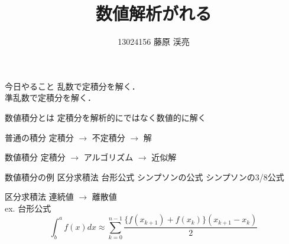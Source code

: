 \documentclass[dvipdfmx,xcolor={svgnames},17pt]{beamer}
\title{数値解析が\jruby{乱数}{み|だ}れる}
\author{13024156 藤原 渓亮}
\begin{document}
  \maketitle

  \begin{frame}{今日やること}
    乱数で定積分を解く．\\
    準乱数で定積分を解く．
  \end{frame}

  \begin{frame}{数値積分とは}
    定積分を解析的にではなく数値的に解く
    \begin{block}{普通の積分}
      定積分 $\rightarrow$ 不定積分 $\rightarrow$ 解
    \end{block}
    \begin{block}{数値積分}
      定積分 $\rightarrow$ アルゴリズム $\rightarrow$ 近似解
    \end{block}
  \end{frame}

  \begin{frame}{数値積分の例}
    区分求積法
      台形公式
      シンプソンの公式
      シンプソンの3/8公式
  \end{frame}

  \begin{frame}{区分求積法}
    連続値 $\rightarrow$ 離散値 \\
    ex. 台形公式
    \begin{equation}
      \int^a_b f(x) dx \approx \sum_{k=0}^{n-1} \frac{\{f(x_{k+1}) + f(x_k)\}(x_{k+1}-x_k)}{2}
    \end{equation}
  \end{frame}
\end{document}

